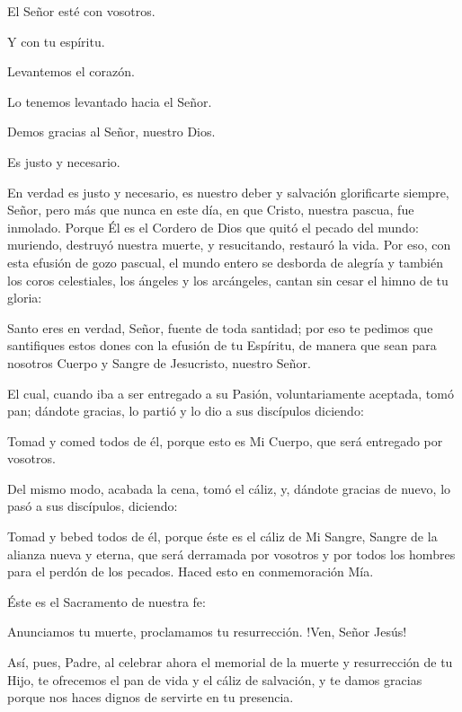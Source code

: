 \pr El Señor esté con vosotros.

\be Y con tu espíritu.

\pr Levantemos el corazón.

\be Lo tenemos levantado hacia el Señor.

\pr Demos gracias al Señor, nuestro Dios.

\be Es justo y necesario.

\pr En verdad es justo y necesario, es nuestro deber y salvación glorificarte siempre, Señor, pero más que nunca en este día, en que Cristo, nuestra pascua, fue inmolado. Porque Él es el Cordero de Dios que quitó el pecado del mundo: muriendo, destruyó nuestra muerte, y resucitando, restauró la vida. Por eso, con esta efusión de gozo pascual, el mundo entero se desborda de alegría y también los coros celestiales, los ángeles y los arcángeles, cantan sin cesar el himno de tu gloria:



\pr Santo eres en verdad, Señor, fuente de toda santidad; por eso te pedimos que santifiques estos dones con la efusión de tu Espíritu, de manera que sean para nosotros Cuerpo y Sangre de Jesucristo, nuestro Señor.

\pr El cual, cuando iba a ser entregado a su Pasión, voluntariamente aceptada, tomó pan; dándote gracias, lo partió y lo dio a sus discípulos diciendo:

\vspace{1em}
\eu Tomad y comed todos de él, porque esto es Mi Cuerpo, que será entregado por vosotros.
\vspace{0.8em}

\pr Del mismo modo, acabada la cena, tomó el cáliz, y, dándote gracias de nuevo, lo pasó a sus discípulos, diciendo:

\vspace{1em}
\eu Tomad y bebed todos de él, porque éste es el cáliz de Mi Sangre, Sangre de la alianza nueva y eterna, que será derramada por vosotros y por todos los hombres para el perdón de los pecados. Haced esto en conmemoración Mía.
\vspace{0.8em}

\pr Éste es el Sacramento de nuestra fe:

\be Anunciamos tu muerte, proclamamos tu resurrección. !Ven, Señor Jesús!

\pr Así, pues, Padre, al celebrar ahora el memorial de la muerte y resurrección de tu Hijo, te ofrecemos el pan de vida y el cáliz de salvación, y te damos gracias porque nos haces dignos de servirte en tu presencia.

